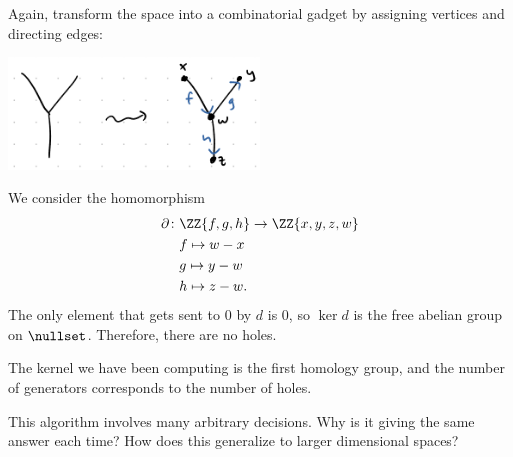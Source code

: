\documentclass{standalone}
\begin{document}
\begin{example}
  Again, transform the space into a combinatorial gadget by assigning
  vertices and directing edges:
  \begin{center}
    \includegraphics[width=0.5\textwidth]{18_905-200902-3.png}
  \end{center}
  We consider the homomorphism
  \begin{align*}
    \partial \colon & \ZZ\{f, g, h\} \to \ZZ\{x, y, z, w\} \\
      & f \mapsto w - x \\
      & g \mapsto y - w \\
      & h \mapsto z - w.
  \end{align*}
  The only element that gets sent to \(0\) by \(d\) is \(0\),
  so \(\ker d\) is the free abelian group on \(\nullset\).
  Therefore, there are no holes.
\end{example}

The kernel we have been computing is the first homology group,
and the number of generators corresponds to the number of holes.

This algorithm involves many arbitrary decisions.
  Why is it giving the same answer each time?
  How does this generalize to larger dimensional spaces?
\end{document}
